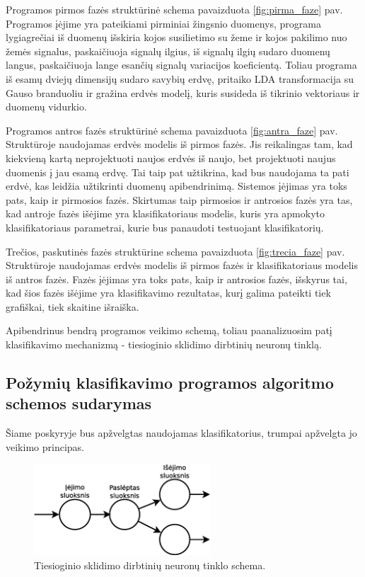 \documentclass[]{vgtuef}
\begin{document}
Programos pirmos fazės struktūrinė schema pavaizduota \ref{fig:pirma_faze} pav. Programos įėjime yra pateikiami pirminiai žingsnio duomenys, programa lygiagrečiai iš duomenų išskiria kojos susilietimo su žeme ir kojos pakilimo nuo žemės signalus, paskaičiuoja signalų ilgius, iš signalų ilgių sudaro duomenų langus, paskaičiuoja lange esančių signalų variacijos koeficientą. Toliau programa iš esamų dviejų dimensijų sudaro savybių erdvę, pritaiko LDA transformacija su Gauso branduoliu ir gražina erdvės modelį, kuris susideda iš tikrinio vektoriaus ir duomenų vidurkio.

Programos antros fazės struktūrinė schema pavaizduota \ref{fig:antra_faze} pav. Struktūroje naudojamas erdvės modelis iš pirmos fazės. Jis reikalingas tam, kad kiekvieną kartą neprojektuoti naujos erdvės iš naujo, bet projektuoti naujus duomenis į jau esamą erdvę. Tai taip pat užtikrina, kad bus naudojama ta pati erdvė, kas leidžia užtikrinti duomenų apibendrinimą. Sistemos įėjimas yra toks pats, kaip ir pirmosios fazės. Skirtumas taip pirmosios ir antrosios fazės yra tas, kad antroje fazės išėjime yra klasifikatoriaus modelis, kuris yra apmokyto klasifikatoriaus parametrai, kurie bus panaudoti testuojant klasifikatorių.

Trečios, paskutinės fazės struktūrine schema pavaizduota \ref{fig:trecia_faze} pav. Struktūroje naudojamas erdvės modelis iš pirmos fazės ir klasifikatoriaus modelis iš antros fazės. Fazės įėjimas yra toks pats, kaip ir antrosios fazės, išskyrus tai, kad šios fazės išėjime yra klasifikavimo rezultatas, kurį galima pateikti tiek grafiškai, tiek skaitine išraiška.

Apibendrinus bendrą programos veikimo schemą, toliau paanalizuosim patį klasifikavimo mechanizmą - tiesioginio sklidimo dirbtinių neuronų tinklą.

\subsection{Požymių klasifikavimo programos algoritmo schemos sudarymas}
\label{subsec:class_scheme}

Šiame poskyryje bus apžvelgtas naudojamas klasifikatorius, trumpai apžvelgta jo veikimo principas.

\begin{figure}[!t]
  \centering
  \includegraphics[width=250px]{figures/ffnn.eps}
  \caption{Tiesioginio sklidimo dirbtinių neuronų tinklo schema.}
  \label{fig:ffnn_schema}
\end{figure}
\end{document}
